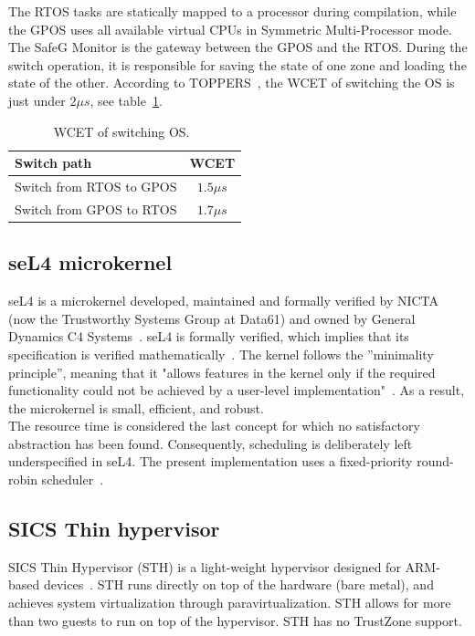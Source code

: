 The RTOS tasks are statically mapped to a processor during compilation, while the GPOS uses all available virtual CPUs in Symmetric Multi-Processor mode.\\

The SafeG Monitor is the gateway between the GPOS and the RTOS. During the switch operation, it is responsible for saving the state of one zone and loading the state of the other. According to TOPPERS~\cite{safegswitch}, the WCET of switching the OS is just under $2 \mu s$, see table~\ref{table:safegswitch}.

\begin{table}[H]
\centering
\begin{tabular}{|l|c|}
\hline
Switch path & WCET\\ \hline
Switch from RTOS to GPOS & $1.5 \mu s$\\ \hline
Switch from GPOS to RTOS & $1.7 \mu s$\\ \hline
\end{tabular}
\caption{WCET of switching OS.~\cite{safegswitch}}
\label{table:safegswitch}
\end{table}

\subsection{seL4 microkernel}
seL4 is a microkernel developed, maintained and formally verified by NICTA (now the Trustworthy Systems Group at Data61) and owned by General Dynamics C4 Systems~\cite{sel4}. seL4 is formally verified, which implies that its specification is verified mathematically~\cite{sel4math}. The kernel follows the ”minimality principle”, meaning that it "allows features in the kernel only if the required functionality could not be achieved by a user-level implementation"~\cite{lyons2014}. As a result, the microkernel is small, efficient, and robust.\\

The resource time is considered the last concept for which no satisfactory abstraction has been found. Consequently, scheduling is deliberately left underspecified in seL4. The present implementation uses a fixed-priority round-robin
scheduler~\cite{lyons2014}. 

\subsection{SICS Thin hypervisor}
SICS Thin Hypervisor (STH) is a light-weight hypervisor designed for ARM-based devices~\cite{STH2013}. STH runs directly on top of the hardware (bare metal), and achieves system virtualization through paravirtualization. STH allows for more than two guests to run on top of the hypervisor. STH has no TrustZone support.\\

